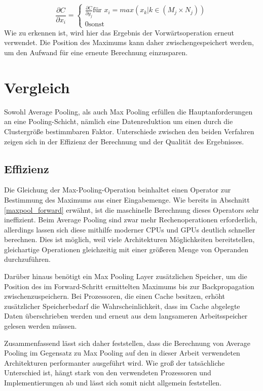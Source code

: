 \documentclass[../main.tex]{subfiles}
\begin{document}
\begin{equation} \label{eq:pooling_backprop_max_final}
   \frac{\partial C}{\partial x_i} = 
   \begin{cases}
     \frac{\partial C}{\partial y_j} \text{für } x_i = max( {x_k | k \in (M_j \times N_j)}) \\
     0 \text{sonst}
   \end{cases}
\end{equation}
Wie zu erkennen ist, wird hier das Ergebnis der Vorwärtsoperation erneut verwendet. Die Position des Maximums kann daher zwischengespeichert werden, um den Aufwand für eine erneute Berechnung einzusparen. 

\section{Vergleich}
Sowohl Average Pooling, als auch Max Pooling erfüllen die Hauptanforderungen an eine Pooling-Schicht, nämlich eine Datenreduktion um einen durch die Clustergröße bestimmbaren Faktor. Unterschiede zwischen den beiden Verfahren zeigen sich in der Effizienz der Berechnung und der Qualität des Ergebnisses. 

\subsection{Effizienz}
Die Gleichung der Max-Pooling-Operation beinhaltet einen Operator zur Bestimmung des Maximums aus einer Eingabemenge. Wie bereits in Abschnitt \ref{maxpool_forward} erwähnt, ist die maschinelle Berechnung dieses Operators sehr ineffizient. Beim Average Pooling sind zwar mehr Rechenoperationen erforderlich, allerdings lassen sich diese mithilfe moderner CPUs und GPUs deutlich schneller berechnen. Dies ist möglich, weil viele Architekturen Möglichkeiten bereitstellen, gleichartige Operationen gleichzeitig mit einer größeren Menge von Operanden durchzuführen. 

Darüber hinaus benötigt ein Max Pooling Layer zusätzlichen Speicher, um die Position des im Forward-Schritt ermittelten Maximums bis zur Backpropagation zwischenzuspeichern. Bei Prozessoren, die einen Cache besitzen, erhöht zusätzlicher Speicherbedarf die Wahrscheinlichkeit, dass im Cache abgelegte Daten überschrieben werden und erneut aus dem langsameren Arbeitsspeicher gelesen werden müssen. 

Zusammenfassend lässt sich daher feststellen, dass die Berechnung von Average Pooling im Gegensatz zu Max Pooling auf den in dieser Arbeit verwendeten Architekturen performanter ausgeführt wird. Wie groß der tatsächliche Unterschied ist, hängt stark von den verwendeten Prozessoren und Implementierungen ab und lässt sich somit nicht allgemein feststellen. 
\end{document}
